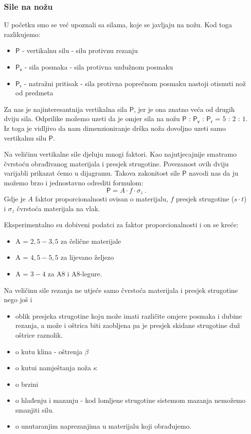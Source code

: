 \documentclass[a4paper,12pt]{article}
\numberwithin{figure}{section}
\begin{document}
\subsubsection*{Sile na nožu}
U početku smo se već upoznali sa silama, koje se javljaju na nožu. Kod toga razlikujemo:
\begin{itemize}
\item $\mathsf{P}$ - vertikalnu silu - silu protivnu rezanju
\item $\mathsf{P_{v}}$ - sila posmaka - sila protivna uzdužnom posmaku
\item $\mathsf{P_{r}}$ - natražni pritisak - sila protivna poprečnom posmaku nastoji otisnuti nož od predmeta
\end{itemize}
Za nas je najinteresantnija vertikalna sila $\mathsf{P}$, jer je ona znatno veća od drugih dviju sila. Odprilike možemo uzeti da je omjer sila na nožu $\mathsf{P}$ : $\mathsf{P_{v}}$ : $\mathsf{P_{r}}$ = $5$ : $2$ : $1$. Iz toga je vidljivo da nam dimenzioniranje drška noža dovoljno uzeti samo vertikalnu silu $\mathsf{P}$. \par
Na veličinu vertikalne sile djeluju mnogi faktori. Kao najutjecajnije smatramo čvrstoću obrađivanog materijala i presjek strugotine. Povezanost ovih dviju varijabli prikazat ćemo u dijagramu.
Takova zakonitost sile $\mathsf{P}$ navodi nas da ju možemo brzo i jednostavno odrediti formulom:
\begin{equation}
\mathsf{P} = A \cdot f \cdot \sigma_{z}\:.
\end{equation}
Gdje je $A$ faktor proporcionalnosti ovisan o materijalu, $f$ presjek strugotine ($s\cdot t$)  i $\sigma_{z}$ čvrstoća materijala na vlak. \par
Eksperimentalno su dobiveni podatci za faktor proporcionalnosti i on se kreće:
\begin{itemize}
\item A = $2,5 - 3,5$ za čelične materijale
\item A = $4,5 - 5,5$ za lijevano željezo
\item A = $3 - 4$ za A8 i A8-legure.
\end{itemize} 
Na veličinu sile rezanja ne utjeće samo čvrstoća materijala i presjek strugotine nego još i
\begin{itemize}
\item oblik presjeka strugotine koju može imati različite omjere posmaka i dubine rezanja, a može i oštrica biti zaobljena pa je presjek skidane strugotine duž oštrice raznolik.
\item o kutu klina - oštrenja $\beta$
\item o kutui namještanja noža $\kappa$
\item o brzini
\item o hlađenju i mazanju - kod lomljene strugotine sistemom mazanja nemožemo smanjiti silu.
\item o unutaranjim naprezanjima u materijalu koji obrađujemo.
\end{itemize} 
\end{document}
